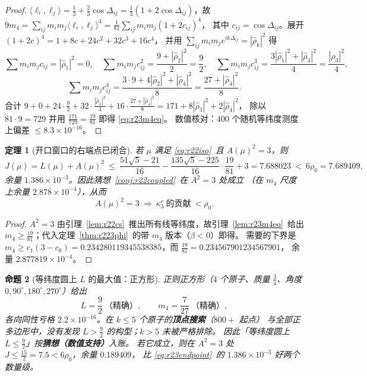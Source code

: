 \documentclass[UTF8,11pt]{ctexart}
\newtheorem{theorem}{定理}[section]
\newtheorem{proposition}[theorem]{命题}
\theoremstyle{definition}
\begin{document}
\begin{proof}
$\langle\ell_i,\ell_j\rangle=\frac13+\frac23\cos\Delta_{ij}=\frac13(1+2\cos\Delta_{ij})$，故
$9m_4=\sum_{ij}m_im_j\langle\ell_i,\ell_j\rangle^4=\frac1{81}\sum_{ij}m_im_j(1+2c_{ij})^4$，
其中 $c_{ij}=\cos\Delta_{ij}$。展开 $(1+2c)^4=1+8c+24c^2+32c^3+16c^4$，
并用 $\sum_{ij}m_im_je^{ik\Delta_{ij}}=|\hat\rho_k|^2$ 得
\[
\sum m_im_jc_{ij}=|\hat\rho_1|^2=0,\quad
\sum m_im_jc_{ij}^2=\frac{9+|\hat\rho_2|^2}2=\frac92,\quad
\sum m_im_jc_{ij}^3=\frac{3|\hat\rho_1|^2+|\hat\rho_3|^2}4=\frac{|\hat\rho_3|^2}4,
\]
\[
\sum m_im_jc_{ij}^4=\frac{3\cdot9+4|\hat\rho_2|^2+|\hat\rho_4|^2}8=\frac{27+|\hat\rho_4|^2}8 .
\]
合计 $9+0+24\cdot\frac92+32\cdot\frac{|\hat\rho_3|^2}4+16\cdot\frac{27+|\hat\rho_4|^2}8
=171+8|\hat\rho_3|^2+2|\hat\rho_4|^2$，
除以 $81\cdot9=729$ 并用 $\frac{171}{729}=\frac{19}{81}$ 即得 \eqref{eq:r23m4eq}。
数值核对：$400$ 个随机等纬度测度上偏差 $\le8.3\times10^{-16}$。
\end{proof}

\begin{theorem}[开口窗口的右端点已闭合]\label{thm:r23endpoint}
若 $\mu$ 满足 \eqref{eq:r22iso}~且 $A(\mu)^2=3$，则
\begin{equation}\label{eq:r23endpoint}
J(\mu)=L(\mu)+A(\mu)^2\ \le\ \frac{51\sqrt5-21}{16}-\frac{135\sqrt5-225}{16}\cdot\frac{19}{81}+3
=7.688023\ <\ 6\rho_0=7.689409,
\end{equation}
余量 $1.386\times10^{-3}$。因此猜想~\ref{conj:r22coupled}~在 $A^2=3$ 处成立
（在 $m_4$ 尺度上余量 $2.878\times10^{-4}$），从而
\begin{equation}\label{eq:r23endcon}
A(\mu)^2=3\ \Longrightarrow\ \kappa_3^c\ \text{的贡献}\ <\rho_0 .
\end{equation}
\end{theorem}

\begin{proof}
$A^2=3$ 由引理~\ref{lem:r22cs}~推出所有线等纬度，故引理~\ref{lem:r23m4eq}~给出
$m_4\ge\frac{19}{81}$；代入定理~\ref{thm:r223phi}~的带 $m_4$ 版本（$\beta<0$）即得。
需要的下界是 $m_4\ge c_1(3-c_0)=0.234280119345538385$，而 $\frac{19}{81}=0.234567901234567901$，
余量 $2.877819\times10^{-4}$。
\end{proof}

\begin{proposition}[等纬度圆上 $L$ 的最大值：正方形]\label{prop:r23Lsq}
正则正方形（$4$ 个原子、质量 $\frac34$、角度 $0,90^\circ,180^\circ,270^\circ$）给出
\begin{equation}\label{eq:r23Lsq}
L=\frac92\ \text{（精确）},\qquad m_4=\frac7{27}\ \text{（精确）},
\end{equation}
各向同性亏格 $2.2\times10^{-16}$。在 $k\le5$ 个原子的\textbf{顶点搜索}（$800+$ 起点）
与全部正多边形中，没有发现 $L>\frac92$ 的构型；$k>5$ 未被严格排除。
因此「等纬度圆上 $L\le\frac92$」按\textbf{猜想（数值支持）}入账。
若它成立，则在 $A^2=3$ 处 $J\le\frac{15}2=7.5<6\rho_0$，余量 $0.189409$，
比 \eqref{eq:r23endpoint}~的 $1.386\times10^{-3}$ 好两个数量级。
\end{proposition}
\end{document}
